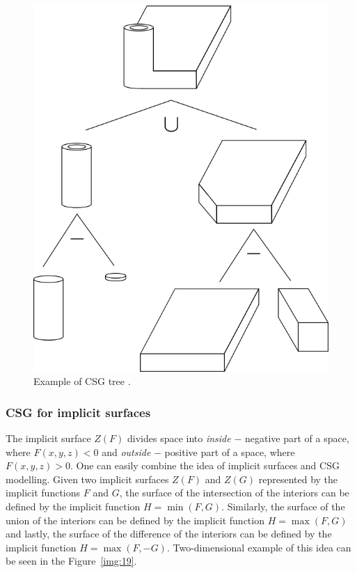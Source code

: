 \begin{figure}[h!]
    \centerline{\includegraphics[scale=0.5]{images/img18}}
    \caption[Example of CSG tree]
    {Example of CSG tree \cite{foley1996computer}.}
    \label{img:18}
\end{figure}

\subsubsection*{CSG for implicit surfaces}
The implicit surface $Z(F)$ divides space into \textit{inside} $-$ negative part of a space,
where $F(x, y, z) < 0$ and
\textit{outside} $-$ positive part of a space, where $F(x, y, z) > 0$. One can easily 
combine the idea of
implicit surfaces and CSG modelling. Given two implicit surfaces $Z(F)$ and $Z(G)$ 
represented by the implicit functions $F$ and $G$, the surface of the
intersection of the interiors can be defined by the implicit function $H=\min(F, G)$.
Similarly, the surface of the union of the interiors can be defined
by the implicit function $H=\max(F, G)$ and lastly, the surface of the difference of
the interiors can be defined by the implicit function $H=\max(F, -G)$. Two-dimensional
example of this idea can be seen in the Figure~\ref{img:19}.

